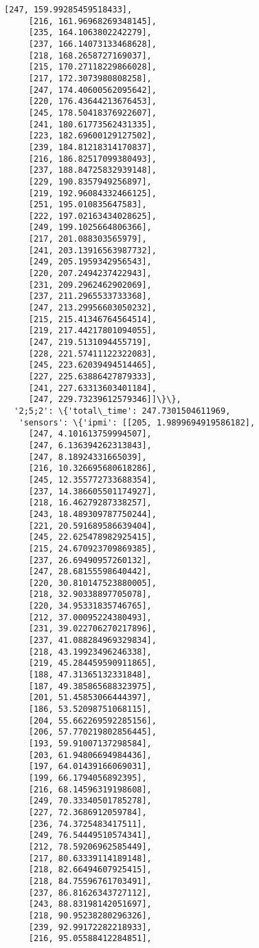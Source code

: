 \documentclass[11pt]{article}
\begin{document}
\begin{tcolorbox}[breakable, size=fbox, boxrule=.5pt, pad at break*=1mm, opacityfill=0]
\begin{Verbatim}[commandchars=\\\{\}]
     [247, 159.99285459518433],
     [216, 161.96968269348145],
     [235, 164.1063802242279],
     [237, 166.14073133468628],
     [218, 168.2658727169037],
     [215, 170.27118229866028],
     [217, 172.3073980808258],
     [247, 174.40600562095642],
     [220, 176.43644213676453],
     [245, 178.50418376922607],
     [241, 180.61773562431335],
     [223, 182.69600129127502],
     [239, 184.81218314170837],
     [216, 186.82517099380493],
     [237, 188.84725832939148],
     [229, 190.8357949256897],
     [219, 192.96084332466125],
     [251, 195.010835647583],
     [222, 197.02163434028625],
     [249, 199.1025664806366],
     [217, 201.088303565979],
     [241, 203.13916563987732],
     [249, 205.1959342956543],
     [220, 207.2494237422943],
     [231, 209.2962462902069],
     [237, 211.2965533733368],
     [247, 213.29956603050232],
     [215, 215.41346764564514],
     [219, 217.44217801094055],
     [247, 219.5131094455719],
     [228, 221.57411122322083],
     [245, 223.62039494514465],
     [227, 225.63886427879333],
     [241, 227.63313603401184],
     [247, 229.73239612579346]]\}\},
  '2;5;2': \{'total\_time': 247.7301504611969,
   'sensors': \{'ipmi': [[205, 1.9899694919586182],
     [247, 4.101613759994507],
     [247, 6.136394262313843],
     [247, 8.18924331665039],
     [216, 10.326695680618286],
     [245, 12.355772733688354],
     [237, 14.386605501174927],
     [218, 16.46279287338257],
     [243, 18.489309787750244],
     [221, 20.591689586639404],
     [245, 22.625478982925415],
     [215, 24.670923709869385],
     [237, 26.69490957260132],
     [247, 28.68155598640442],
     [220, 30.810147523880005],
     [218, 32.90338897705078],
     [220, 34.95331835746765],
     [212, 37.00095224380493],
     [231, 39.022706270217896],
     [237, 41.088284969329834],
     [218, 43.19923496246338],
     [219, 45.284459590911865],
     [188, 47.31365132331848],
     [187, 49.385865688323975],
     [201, 51.45853066444397],
     [186, 53.52098751068115],
     [204, 55.662269592285156],
     [206, 57.770219802856445],
     [193, 59.91007137298584],
     [203, 61.94806694984436],
     [197, 64.01439166069031],
     [199, 66.1794056892395],
     [216, 68.14596319198608],
     [249, 70.33340501785278],
     [227, 72.3686912059784],
     [236, 74.3725483417511],
     [249, 76.54449510574341],
     [212, 78.59206962585449],
     [217, 80.63339114189148],
     [218, 82.66494607925415],
     [218, 84.75596761703491],
     [237, 86.81626343727112],
     [243, 88.83198142051697],
     [218, 90.95238280296326],
     [239, 92.99172282218933],
     [216, 95.05588412284851],

\end{Verbatim}
\end{tcolorbox}
\end{document}
